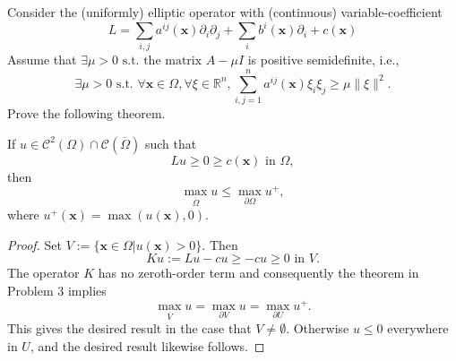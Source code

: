 \begin{pro}
  Consider the (uniformly) elliptic operator with (continuous) variable-coefficient
  \begin{displaymath}
    L = \sum_{i, j}a^{ij}(\mathbf{x})\partial_i\partial_j + \sum_ib^i(\mathbf{x})\partial_i + c(\mathbf{x})
  \end{displaymath}
  Assume that $\exists\mu>0 \text{ s.t. the matrix } A-\mu I$ is positive
  semidefinite, i.e.,
  \begin{displaymath}
    \exists \mu>0 \text{ s.t. } \forall\mathbf{x}\in\Omega,
    \forall\xi\in\mathbb{R}^n, \sum_{i,j=1}^na^{ij}(\mathbf{x})\xi_i\xi_j
    \ge \mu\|\xi\|^2.
  \end{displaymath}
  Prove the following theorem.
  \begin{thm}
    If $u\in\mathcal{C}^2(\Omega)\cap\mathcal{C}(\overline{\Omega})$
    such that
    \begin{displaymath}
      Lu \ge 0 \ge c(\mathbf{x}) \text{ in } \Omega,
    \end{displaymath}
    then
    \begin{displaymath}
      \max_{\overline{\Omega}} u \le \max_{\partial\Omega}u^+, 
    \end{displaymath}
    where $u^+(\mathbf{x}) = \max(u(\mathbf{x}), 0)$.
  \end{thm}
\end{pro}
\begin{proof}
  Set $V := \{\mathbf{x}\in\Omega| u(\mathbf{x})>0\}$.
  Then
  \begin{displaymath}
    Ku := Lu - cu \ge -cu \ge 0 \text{ in } V.
  \end{displaymath}
  The operator $K$ has no zeroth-order term
  and consequently the theorem in Problem 3 implies
  \begin{displaymath}
    \max_{\overline{V}}u = \max_{\partial V}u = \max_{\partial U}u^+.
  \end{displaymath}
  This gives the desired result in the case that $V\neq \emptyset$.
  Otherwise $u\le 0$ everywhere in $U$,
  and the desired result likewise follows.
\end{proof}

